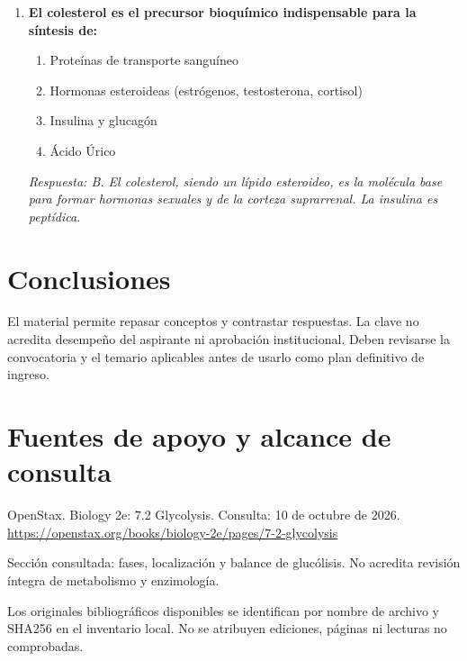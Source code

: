 \begin{enumerate}[label=\textbf{\arabic*.}]
    \item \textbf{El colesterol es el precursor bioquímico indispensable para la síntesis de:}
    \begin{enumerate}
        \item[A)] Proteínas de transporte sanguíneo
        \item[B)] Hormonas esteroideas (estrógenos, testosterona, cortisol)
        \item[C)] Insulina y glucagón
        \item[D)] Ácido Úrico
    \end{enumerate}
    \textit{Respuesta: B. El colesterol, siendo un lípido esteroideo, es la molécula base para formar hormonas sexuales y de la corteza suprarrenal. La insulina es peptídica.}

\end{enumerate}

\section{Conclusiones}
El material permite repasar conceptos y contrastar respuestas. La clave no acredita desempeño del aspirante ni aprobación institucional. Deben revisarse la convocatoria y el temario aplicables antes de usarlo como plan definitivo de ingreso.
\clearpage\section{Fuentes de apoyo y alcance de consulta}
OpenStax. Biology 2e: 7.2 Glycolysis. Consulta: 10 de octubre de 2026. \url{https://openstax.org/books/biology-2e/pages/7-2-glycolysis}\par Sección consultada: fases, localización y balance de glucólisis. No acredita revisión íntegra de metabolismo y enzimología.\par\medskip
Los originales bibliográficos disponibles se identifican por nombre de archivo y SHA256 en el inventario local. No se atribuyen ediciones, páginas ni lecturas no comprobadas.

